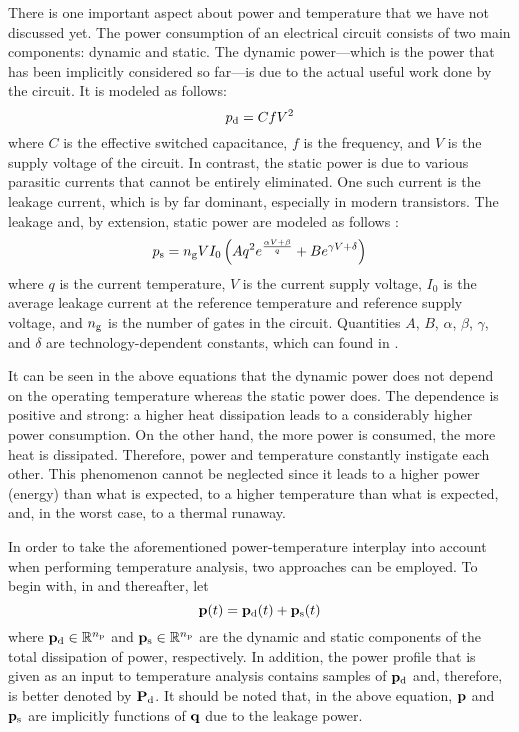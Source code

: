 There is one important aspect about power and temperature that we have not
discussed yet. The power consumption of an electrical circuit consists of two
main components: dynamic and static. The dynamic power---which is the power that
has been implicitly considered so far---is due to the actual useful work done by
the circuit. It is modeled as follows:
\[
  p_{\mathrm{d}} = C f V^2
\]
where $C$ is the effective switched capacitance, $f$ is the frequency, and $V$
is the supply voltage of the circuit. In contrast, the static power is due to
various parasitic currents that cannot be entirely eliminated. One such current
is the leakage current, which is by far dominant, especially in modern 
transistors. The leakage and, by extension, static power are modeled as follows
\cite{liao2005}:
\begin{equation} \elab{static-power}
  p_\static = \numberof{g} V I_0 \left( A q^2 e^{\frac{\alpha V + \beta}{q}} + B e^{\gamma V + \delta} \right)
\end{equation}
where $q$ is the current temperature, $V$ is the current supply voltage, $I_0$
is the average leakage current at the reference temperature and reference supply
voltage, and ${n_\mathrm{g}}$ is the number of gates in the circuit. Quantities
$A$, $B$, $\alpha$, $\beta$, $\gamma$, and $\delta$ are technology-dependent
constants, which can found in \cite{liao2005}.

It can be seen in the above equations that the dynamic power does not depend on
the operating temperature whereas the static power does. The dependence is
positive and strong: a higher heat dissipation leads to a considerably higher
power consumption. On the other hand, the more power is consumed, the more heat
is dissipated. Therefore, power and temperature constantly instigate each other.
This phenomenon cannot be neglected since it leads to a higher power (energy)
than what is expected, to a higher temperature than what is expected, and, in
the worst case, to a thermal runaway.

In order to take the aforementioned power-temperature interplay into account
when performing temperature analysis, two approaches can be employed. To begin
with, in  and thereafter, let
\[
  \mathbf{p}(t) = \mathbf{p}_{\mathrm{d}}(t) + \mathbf{p}_{\mathrm{s}}(t)
\]
where $\mathbf{p}_{\mathrm{d}} \in \mathbb{R}^{n_\mathrm{p}}$ and $\mathbf{p}_{\mathrm{s}} \in \mathbb{R}^{n_\mathrm{p}}$ are the
dynamic and static components of the total dissipation of power, respectively.
In addition, the power profile that is given as an input to temperature analysis
contains samples of $\mathbf{p}_{\mathrm{d}}$ and, therefore, is better denoted by
$\mathbf{P}_{\mathrm{d}}$. It should be noted that, in the above equation, $\mathbf{p}$ and
$\mathbf{p}_{\mathrm{s}}$ are implicitly functions of $\mathbf{q}$ due to the leakage power.

